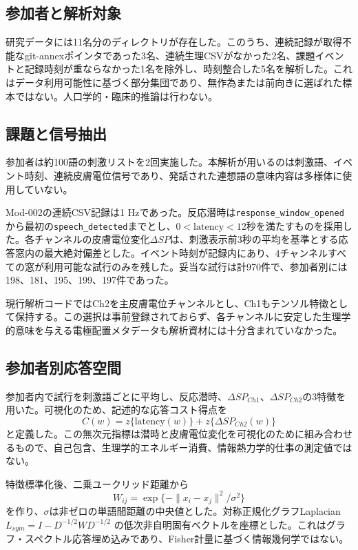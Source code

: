 \documentclass[a4paper,11pt]{article}
\begin{document}
\subsection{参加者と解析対象}
研究データには11名分のディレクトリが存在した。このうち、連続記録が取得不能なgit-annexポインタであった3名、連続生理CSVがなかった2名、課題イベントと記録時刻が重ならなかった1名を除外し、時刻整合した5名を解析した。これはデータ利用可能性に基づく部分集団であり、無作為または前向きに選ばれた標本ではない。人口学的・臨床的推論は行わない。

\subsection{課題と信号抽出}
参加者は約100語の刺激リストを2回実施した。本解析が用いるのは刺激語、イベント時刻、連続皮膚電位信号であり、発話された連想語の意味内容は多様体に使用していない。

Mod-002の連続CSV記録は1 Hzであった。反応潜時は\texttt{response\_window\_opened}から最初の\texttt{speech\_detected}までとし、$0<\mathrm{latency}<12$秒を満たすものを採用した。各チャンネルの皮膚電位変化$\Delta SP$は、刺激表示前3秒の平均を基準とする応答窓内の最大絶対偏差とした。イベント時刻が記録内にあり、4チャンネルすべての窓が利用可能な試行のみを残した。妥当な試行は計970件で、参加者別には198、181、195、199、197件であった。

現行解析コードではCh2を主皮膚電位チャンネルとし、Ch1もテンソル特徴として保持する。この選択は事前登録されておらず、各チャンネルに安定した生理学的意味を与える電極配置メタデータも解析資材には十分含まれていなかった。

\subsection{参加者別応答空間}
参加者内で試行を刺激語ごとに平均し、反応潜時、$\Delta SP_{Ch1}$、$\Delta SP_{Ch2}$の3特徴を用いた。可視化のため、記述的な応答コスト得点を
\begin{equation}
C(w)=z\{\mathrm{latency}(w)\}+z\{\Delta SP_{Ch2}(w)\}
\end{equation}
と定義した。この無次元指標は潜時と皮膚電位変化を可視化のために組み合わせるもので、自己包含、生理学的エネルギー消費、情報熱力学的仕事の測定値ではない。

特徴標準化後、二乗ユークリッド距離から
\begin{equation}
W_{ij}=\exp\{-\lVert x_i-x_j\rVert^2/\sigma^2\}
\end{equation}
を作り、$\sigma$は非ゼロの単語間距離の中央値とした。対称正規化グラフLaplacian $L_{sym}=I-D^{-1/2}WD^{-1/2}$ の低次非自明固有ベクトルを座標とした。これはグラフ・スペクトル応答埋め込みであり、Fisher計量に基づく情報幾何学ではない。
\end{document}
